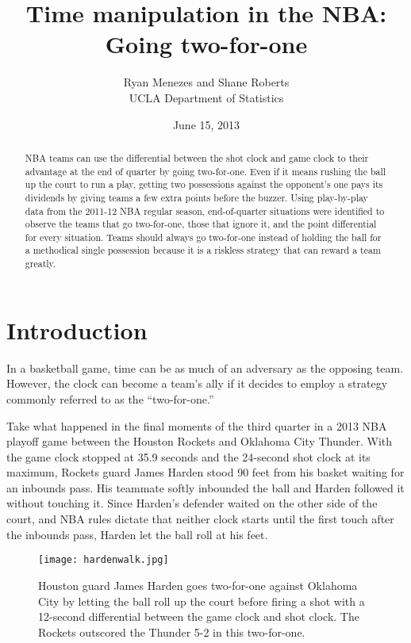 \documentclass{article}
\title{Time manipulation in the NBA: \\ Going two-for-one}
\author{Ryan Menezes and Shane Roberts \\
UCLA Department of Statistics}
\date{June 15, 2013}
\begin{document}


\maketitle

\begin{abstract}
NBA teams can use the differential between the shot clock and game clock to their advantage at the end of quarter by going two-for-one. Even if it means rushing the ball up the court to run a play, getting two possessions against the opponent's one pays its dividends by giving teams a few extra points before the buzzer. Using play-by-play data from the 2011-12 NBA regular season, end-of-quarter situations were identified to observe the teams that go two-for-one, those that ignore it, and the point differential for every situation. Teams should always go two-for-one instead of holding the ball for a methodical single possession because it is a riskless strategy that can reward a team greatly. 
\end{abstract}

\section{Introduction}

In a basketball game, time can be as much of an adversary as the opposing team. However, the clock can become a team's ally if it decides to employ a strategy commonly referred to as the ``two-for-one.''

Take what happened in the final moments of the third quarter in a 2013 NBA playoff game between the Houston Rockets and Oklahoma City Thunder. With the game clock stopped at 35.9 seconds and the 24-second shot clock at its maximum, Rockets guard James Harden stood 90 feet from his basket waiting for an inbounds pass. His teammate softly inbounded the ball and Harden followed it without touching it. Since Harden's defender waited on the other side of the court, and NBA rules dictate that neither clock starts until the first touch after the inbounds pass, Harden let the ball roll at his feet.

\begin{figure}[h]
\centering
\texttt{[image: hardenwalk.jpg]}
\caption{Houston guard James Harden goes two-for-one against Oklahoma City by letting the ball roll up the court before firing a shot with a 12-second differential between the game clock and shot clock. The Rockets outscored the Thunder 5-2 in this two-for-one.}
\end{figure}
\end{document}
